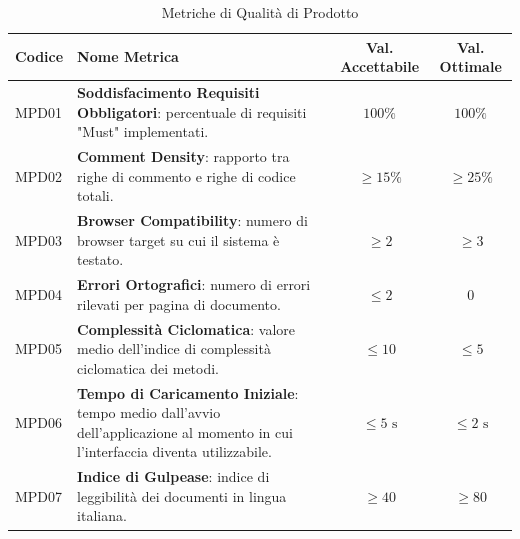 \begin{table}[H]
    \centering
    \renewcommand{\arraystretch}{1.3}
    \begin{tabularx}{\textwidth}{|l|X|c|c|}
        \hline
        \rowcolor{primarycolor!10}
        \textbf{Codice} & \textbf{Nome Metrica} & \textbf{Val. Accettabile} & \textbf{Val. Ottimale} \\
        \hline
        MPD01 & \textbf{Soddisfacimento Requisiti Obbligatori}: percentuale di requisiti "Must" implementati. & $100\%$ & $100\%$ \\
        \hline
        MPD02 & \textbf{Comment Density}: rapporto tra righe di commento e righe di codice totali. & $\ge 15\%$ & $\ge 25\%$ \\
        \hline
        MPD03 & \textbf{Browser Compatibility}: numero di browser target su cui il sistema è testato. & $\ge 2$ & $\ge 3$ \\
        \hline
        MPD04 & \textbf{Errori Ortografici}: numero di errori rilevati per pagina di documento. & $\le 2$ & $0$ \\
        \hline
        MPD05 & \textbf{Complessità Ciclomatica}: valore medio dell'indice di complessità ciclomatica dei metodi. & $\le 10$ & $\le 5$\\
        \hline
        MPD06 & \textbf{Tempo di Caricamento Iniziale}: tempo medio dall'avvio dell'applicazione al momento in cui l'interfaccia diventa utilizzabile. & $\le 5 \text{ s}$ & $\le 2 \text{ s}$ \\
        \hline
        MPD07 & \textbf{Indice di Gulpease}: indice di leggibilità dei documenti in lingua italiana. & $\ge 40$ & $\ge 80$ \\
        \hline
    \end{tabularx}
    \caption{Metriche di Qualità di Prodotto}
\end{table}

\vspace{0.5cm}
